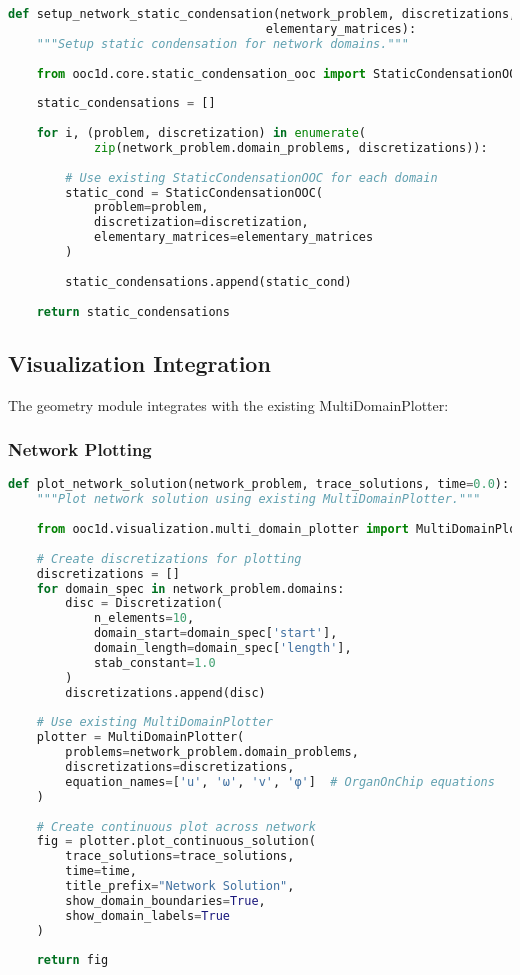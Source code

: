 \begin{lstlisting}[language=Python, caption=Static Condensation Integration]
def setup_network_static_condensation(network_problem, discretizations, 
                                    elementary_matrices):
    """Setup static condensation for network domains."""
    
    from ooc1d.core.static_condensation_ooc import StaticCondensationOOC
    
    static_condensations = []
    
    for i, (problem, discretization) in enumerate(
            zip(network_problem.domain_problems, discretizations)):
        
        # Use existing StaticCondensationOOC for each domain
        static_cond = StaticCondensationOOC(
            problem=problem,
            discretization=discretization,
            elementary_matrices=elementary_matrices
        )
        
        static_condensations.append(static_cond)
    
    return static_condensations
\end{lstlisting}

\subsection{Visualization Integration}
\label{subsec:visualization_integration}

The geometry module integrates with the existing MultiDomainPlotter:

\subsubsection{Network Plotting}

\begin{lstlisting}[language=Python, caption=Network Visualization]
def plot_network_solution(network_problem, trace_solutions, time=0.0):
    """Plot network solution using existing MultiDomainPlotter."""
    
    from ooc1d.visualization.multi_domain_plotter import MultiDomainPlotter
    
    # Create discretizations for plotting
    discretizations = []
    for domain_spec in network_problem.domains:
        disc = Discretization(
            n_elements=10,
            domain_start=domain_spec['start'],
            domain_length=domain_spec['length'],
            stab_constant=1.0
        )
        discretizations.append(disc)
    
    # Use existing MultiDomainPlotter
    plotter = MultiDomainPlotter(
        problems=network_problem.domain_problems,
        discretizations=discretizations,
        equation_names=['u', 'ω', 'v', 'φ']  # OrganOnChip equations
    )
    
    # Create continuous plot across network
    fig = plotter.plot_continuous_solution(
        trace_solutions=trace_solutions,
        time=time,
        title_prefix="Network Solution",
        show_domain_boundaries=True,
        show_domain_labels=True
    )
    
    return fig
\end{lstlisting}

